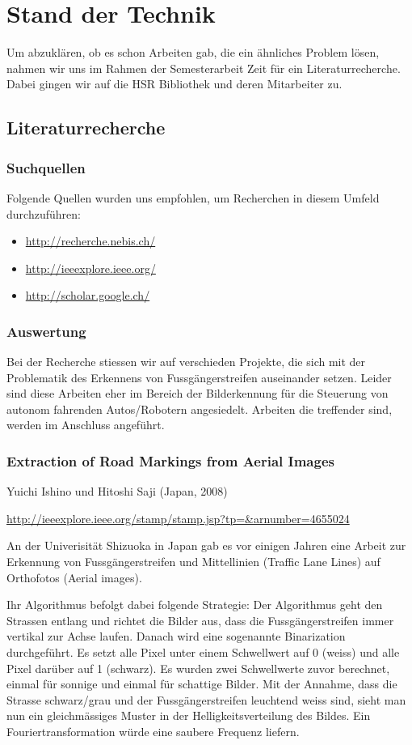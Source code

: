 \chapter*{Stand der Technik}
Um abzuklären, ob es schon Arbeiten gab, die ein ähnliches Problem lösen, nahmen wir uns im Rahmen der Semesterarbeit Zeit für ein Literaturrecherche. Dabei gingen wir auf die HSR Bibliothek und deren Mitarbeiter zu.
\section{Literaturrecherche}
\subsection{Suchquellen}
Folgende Quellen wurden uns empfohlen, um Recherchen in diesem Umfeld durchzuführen:
\begin{itemize}
	\item \url{http://recherche.nebis.ch/}
    \item \url{http://ieeexplore.ieee.org/}
    \item \url{http://scholar.google.ch/}
\end{itemize}

\subsection{Auswertung}
Bei der Recherche stiessen wir auf verschieden Projekte, die sich mit der Problematik des Erkennens von Fussgängerstreifen auseinander setzen. Leider sind diese Arbeiten eher im Bereich der Bilderkennung für die Steuerung von autonom fahrenden Autos/Robotern angesiedelt. Arbeiten die treffender sind, werden im Anschluss angeführt.
\subsection{Extraction of Road Markings from Aerial Images}
Yuichi Ishino und Hitoshi Saji (Japan, 2008) \newline 

\onehalfspacing 
\url{http://ieeexplore.ieee.org/stamp/stamp.jsp?tp=\&arnumber=4655024}
\onehalfspacing

An der Univerisität Shizuoka in Japan gab es vor einigen Jahren eine Arbeit zur Erkennung von Fussgängerstreifen und Mittellinien (Traffic Lane Lines) auf Orthofotos (Aerial images).

Ihr Algorithmus befolgt dabei folgende Strategie:
Der Algorithmus geht den Strassen entlang und richtet die Bilder aus, dass die Fussgängerstreifen immer vertikal zur Achse laufen. Danach wird eine sogenannte Binarization durchgeführt. Es setzt alle Pixel unter einem Schwellwert auf 0 (weiss) und alle Pixel darüber auf 1 (schwarz). Es wurden zwei Schwellwerte zuvor berechnet, einmal für sonnige und einmal für schattige Bilder.
Mit der Annahme, dass die Strasse schwarz/grau und der Fussgängerstreifen leuchtend weiss sind, sieht man nun ein gleichmässiges Muster in der Helligkeitsverteilung des Bildes. Ein Fouriertransformation würde eine saubere Frequenz liefern.

